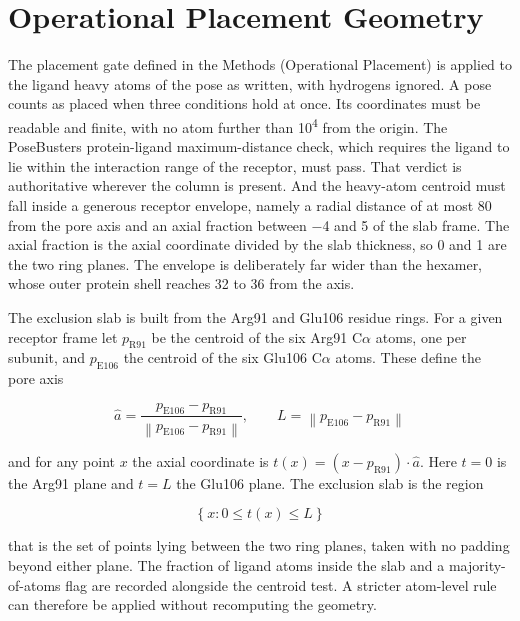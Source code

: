 \hypertarget{placement-envelope-geometry}{%
\section{Operational Placement Geometry}\label{placement-envelope-geometry}}

The placement gate defined in the Methods (Operational Placement) is applied to the ligand heavy atoms of the pose as written, with hydrogens ignored. A pose counts as placed when three conditions hold at once. Its coordinates must be readable and finite, with no atom further than 10\textsuperscript{4}\angstrom{} from the origin. The PoseBusters protein-ligand maximum-distance check, which requires the ligand to lie within the interaction range of the receptor, must pass. That verdict is authoritative wherever the column is present. And the heavy-atom centroid must fall inside a generous receptor envelope, namely a radial distance of at most 80\angstrom{} from the pore axis and an axial fraction between \ensuremath{-}4 and 5 of the slab frame. The axial fraction is the axial coordinate divided by the slab thickness, so 0 and 1 are the two ring planes. The envelope is deliberately far wider than the hexamer, whose outer protein shell reaches 32 to 36\angstrom{} from the axis.

The exclusion slab is built from the Arg91 and Glu106 residue rings. For a given receptor frame let \(p_{\text{R91}}\) be the centroid of the six Arg91 C\ensuremath{\alpha} atoms, one per subunit, and \(p_{\text{E106}}\) the centroid of the six Glu106 C\ensuremath{\alpha} atoms. These define the pore axis

\[\hat{a} = \frac{p_{\text{E106}} - p_{\text{R91}}}{\left\| p_{\text{E106}} - p_{\text{R91}} \right\|},\qquad L = \left\| p_{\text{E106}} - p_{\text{R91}} \right\|\]

and for any point \(x\) the axial coordinate is \(t(x) = (x - p_{\text{R91}}) \cdot \hat{a}\). Here \(t = 0\) is the Arg91 plane and \(t = L\) the Glu106 plane. The exclusion slab is the region

\[\left\{ x : 0 \leq t(x) \leq L \right\}\]

that is the set of points lying between the two ring planes, taken with no padding beyond either plane. The fraction of ligand atoms inside the slab and a majority-of-atoms flag are recorded alongside the centroid test. A stricter atom-level rule can therefore be applied without recomputing the geometry.

